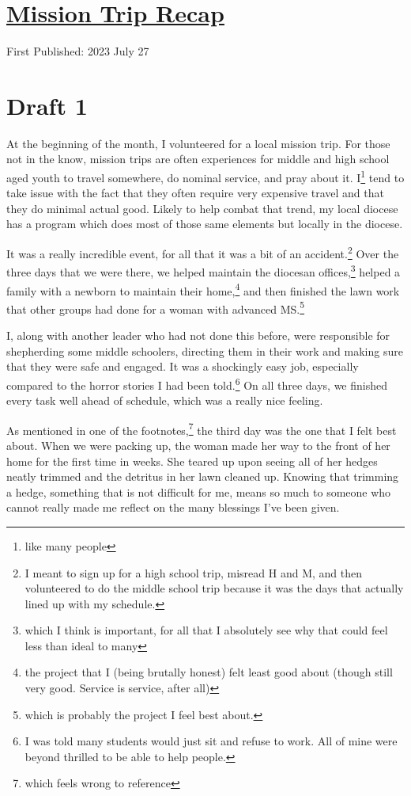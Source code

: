 \documentclass[12pt]{article}[titlepage]
\newcommand{\1}{\={a}}
\newcommand{\2}{\={e}}
\newcommand{\3}{\={\i}}
\newcommand{\4}{\=o}
\newcommand{\5}{\=u}
\newcommand{\6}{\={A}}
\renewcommand{\,}{\textsuperscript{,}}
\begin{document}
\doublespacing
\section{\href{mission-trip.html}{Mission Trip Recap}}
First Published: 2023 July 27
\section{Draft 1}
At the beginning of the month, I volunteered for a local mission trip.
For those not in the know, mission trips are often experiences for middle and high school aged youth to travel somewhere, do nominal service, and pray about it.
I\footnote{like many people} tend to take issue with the fact that they often require very expensive travel and that they do minimal actual good.
Likely to help combat that trend, my local diocese has a program which does most of those same elements but locally in the diocese.

It was a really incredible event, for all that it was a bit of an accident.\footnote{I meant to sign up for a high school trip, misread H and M, and then volunteered to do the middle school trip because it was the days that actually lined up with my schedule.}
Over the three days that we were there, we helped maintain the diocesan offices,\footnote{which I think is important, for all that I absolutely see why that could feel less than ideal to many} helped a family with a newborn to maintain their home,\footnote{the project that I (being brutally honest) felt least good about (though still very good. Service is service, after all)} and then finished the lawn work that other groups had done for a woman with advanced MS.\footnote{which is probably the project I feel best about.}

I, along with another leader who had not done this before, were responsible for shepherding some middle schoolers, directing them in their work and making sure that they were safe and engaged.
It was a shockingly easy job, especially compared to the horror stories I had been told.\footnote{I was told many students would just sit and refuse to work. All of mine were beyond thrilled to be able to help people.}
On all three days, we finished every task well ahead of schedule, which was a really nice feeling.

As mentioned in one of the footnotes,\footnote{which feels wrong to reference} the third day was the one that I felt best about.
When we were packing up, the woman made her way to the front of her home for the first time in weeks.
She teared up upon seeing all of her hedges neatly trimmed and the detritus in her lawn cleaned up.
Knowing that trimming a hedge, something that is not difficult for me, means so much to someone who cannot really made me reflect on the many blessings I've been given.
\end{document}
